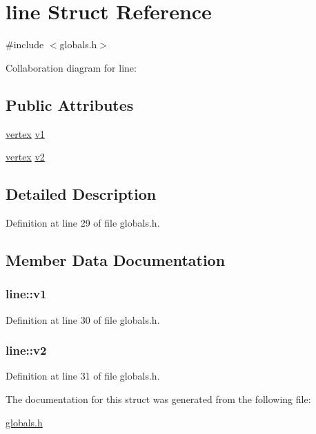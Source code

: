 \hypertarget{structline}{}\section{line Struct Reference}
\label{structline}


{\ttfamily \#include $<$globals.\+h$>$}



Collaboration diagram for line\+:
\subsection*{Public Attributes}
\begin{DoxyCompactItemize}
\item 
\hyperlink{structvertex}{vertex} \hyperlink{structline_a08951afed405209d06af047ad3f34217}{v1}
\item 
\hyperlink{structvertex}{vertex} \hyperlink{structline_a2c533722405cf4d02ed2017eedd5ad3b}{v2}
\end{DoxyCompactItemize}


\subsection{Detailed Description}


Definition at line 29 of file globals.\+h.



\subsection{Member Data Documentation}
\subsubsection[{\texorpdfstring{v1}{v1}}]{ line\+::v1}\hypertarget{structline_a08951afed405209d06af047ad3f34217}{}\label{structline_a08951afed405209d06af047ad3f34217}


Definition at line 30 of file globals.\+h.

\subsubsection[{\texorpdfstring{v2}{v2}}]{ line\+::v2}\hypertarget{structline_a2c533722405cf4d02ed2017eedd5ad3b}{}\label{structline_a2c533722405cf4d02ed2017eedd5ad3b}


Definition at line 31 of file globals.\+h.



The documentation for this struct was generated from the following file\+:\begin{DoxyCompactItemize}
\item 
\hyperlink{globals_8h}{globals.\+h}\end{DoxyCompactItemize}

